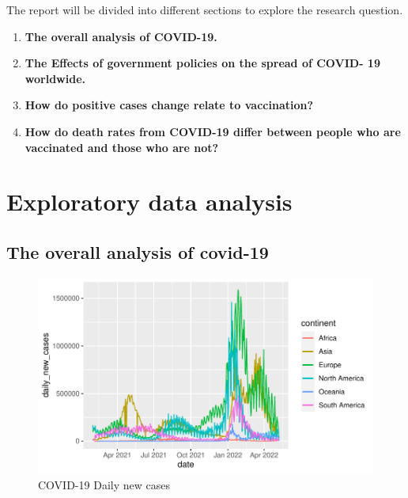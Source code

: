 \documentclass[11pt,a4paper,]{article}
\begin{document}
The report will be divided into different sections to explore the research question.

\begin{enumerate}
\def\labelenumi{(\arabic{enumi})}
\item
  \textbf{The overall analysis of COVID-19.}
\item
  \textbf{The Effects of government policies on the spread of COVID- 19 worldwide.}
\item
  \textbf{How do positive cases change relate to vaccination?}
\item
  \textbf{How do death rates from COVID-19 differ between people who are vaccinated and those who are not?}
\end{enumerate}

\clearpage

\hypertarget{exploratory-data-analysis}{%
\section{\texorpdfstring{\textbf{Exploratory data analysis}}{Exploratory data analysis}}\label{exploratory-data-analysis}}

\hypertarget{the-overall-analysis-of-covid-19}{%
\subsection{\texorpdfstring{\textbf{The overall analysis of covid-19}}{The overall analysis of covid-19}}\label{the-overall-analysis-of-covid-19}}

\begin{figure}

{\centering \includegraphics{report_files/figure-latex/Figure1-1} 

}

\caption{COVID-19 Daily new cases}\label{fig:Figure1}
\end{figure}
\end{document}
